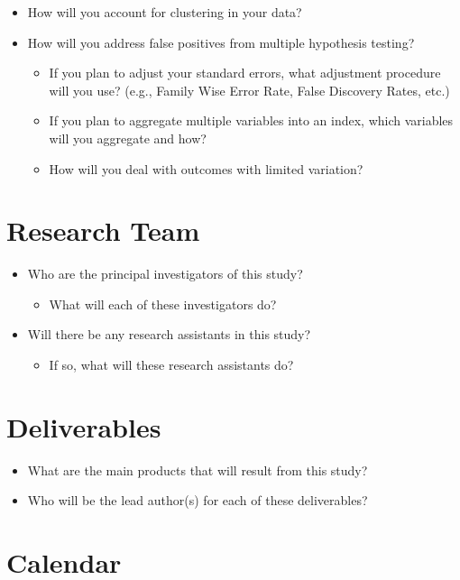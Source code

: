 \documentclass[12pt]{article}
\begin{document}
\begin{itemize}
\item How will you account for clustering in your data?
\item How will you address false positives from multiple hypothesis testing?
\begin{itemize}
\item If you plan to adjust your standard errors, what adjustment procedure will you use? (e.g., Family Wise Error Rate, False Discovery Rates, etc.)
\item If you plan to aggregate multiple variables into an index, which variables will you aggregate and how?
\item How will you deal with outcomes with limited variation?
\end{itemize}
\end{itemize}

\section{Research Team}

\begin{itemize}
\item Who are the principal investigators of this study?
\begin{itemize}
\item What will each of these investigators do?
\end{itemize}
\item Will there be any research assistants in this study?
\begin{itemize}
\item If so, what will these research assistants do? 
\end{itemize}
\end{itemize}

\section{Deliverables}

\begin{itemize}
\item What are the main products that will result from this study?
\item Who will be the lead author(s) for each of these deliverables?
\end{itemize}

\section{Calendar}
\end{document}
